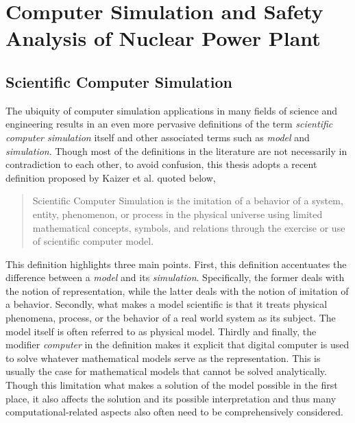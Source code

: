\section{Computer Simulation and Safety Analysis of Nuclear Power Plant}\label{sec:intro_computer_simulation}


\subsection{Scientific Computer Simulation}\label{sub:intro_scientific_computer_simulation}

The ubiquity of computer simulation applications in many fields of science and engineering results in an even more pervasive definitions of the term \textit{scientific computer simulation} itself and other associated terms such as \textit{model} and \textit{simulation}.
Though most of the definitions in the literature are not necessarily in contradiction to each other, 
to avoid confusion, this thesis adopts a recent definition proposed by Kaizer et al.\cite{Kaizer2015} quoted below,
\begin{quote}
	Scientific Computer Simulation is the imitation of a behavior of a system, entity, phenomenon, or process in the physical universe 
	using limited mathematical concepts, symbols, and relations through the exercise or use of scientific computer model.
\end{quote}

This definition highlights three main points.
First, this definition accentuates the difference between a \emph{model} and its \emph{simulation}.
Specifically, the former deals with the notion of representation, while the latter deals with the notion of imitation of a behavior.
Secondly, what makes a model scientific is that it treats physical phenomena, process, or the behavior of a real world system as its subject.
The model itself is often referred to as physical model.
Thirdly and finally, the modifier \emph{computer} in the definition makes it explicit that digital computer is used to solve whatever mathematical models serve as the representation.
This is usually the case for mathematical models that cannot be solved analytically.
Though this limitation what makes a solution of the model possible in the first place, 
it also affects the solution and its possible interpretation and thus many computational-related aspects also often need to be comprehensively considered.

